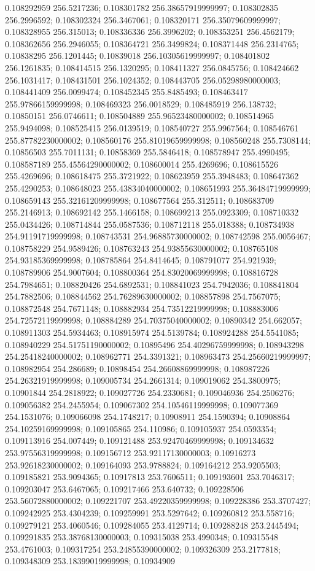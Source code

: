 0.108292959 256.5217236; 0.108301782 256.38657919999997; 0.108302835 256.2996592; 0.108302324 256.3467061; 0.108320171 256.35079609999997; 0.108328955 256.315013; 0.108336336 256.3996202; 0.108353251 256.4562179; 0.108362656 256.2946055; 0.108364721 256.3499824; 0.108371448 256.2314765; 0.10838295 256.1201445; 0.10839018 256.10305619999997; 0.108401802 256.1261835; 0.108414515 256.1320295; 0.108411327 256.0845756; 0.108424662 256.1031417; 0.108431501 256.1024352; 0.108443705 256.05298980000003; 0.108441409 256.0099474; 0.108452345 255.8485493; 0.108463417 255.97866159999998; 0.108469323 256.0018529; 0.108485919 256.138732; 0.10850151 256.0746611; 0.108504889 255.96523480000002; 0.108514965 255.9494098; 0.108525415 256.0139519; 0.108540727 255.9967564; 0.108546761 255.87782230000002; 0.108560176 255.81019659999998; 0.108560248 255.7308144; 0.10856503 255.7011131; 0.10858369 255.5846418; 0.108578947 255.4990495; 0.108587189 255.45564290000002; 0.108600014 255.4269696; 0.108615526 255.4269696; 0.108618475 255.3721922; 0.108623959 255.3948483; 0.108647362 255.4290253; 0.108648023 255.43834040000002; 0.108651993 255.36484719999999; 0.108659143 255.32161209999998; 0.108677564 255.312511; 0.108683709 255.2146913; 0.108692142 255.1466158; 0.108699213 255.0923309; 0.108710332 255.0434426; 0.108714844 255.0587536; 0.108712118 255.018388; 0.108734938 254.91191719999998; 0.108743531 254.96885730000002; 0.108742598 255.0056467; 0.108758229 254.9589426; 0.108763243 254.93855630000002; 0.108765108 254.93185369999998; 0.108785864 254.8414645; 0.108791077 254.921939; 0.108789906 254.9007604; 0.108800364 254.83020069999998; 0.108816728 254.7984651; 0.108820426 254.6892531; 0.108841023 254.7942036; 0.108841804 254.7882506; 0.108844562 254.76289630000002; 0.108857898 254.7567075; 0.108872548 254.7671148; 0.108882934 254.73512219999998; 0.108883006 254.72572119999998; 0.108884289 254.70375040000002; 0.10890342 254.662057; 0.108911303 254.5934463; 0.108915974 254.5139784; 0.108924288 254.5541085; 0.108940229 254.51751190000002; 0.10895496 254.40296759999998; 0.108943298 254.25418240000002; 0.108962771 254.3391321; 0.108963473 254.25660219999997; 0.108982954 254.286689; 0.10898454 254.26608869999998; 0.108987226 254.26321919999998; 0.109005734 254.2661314; 0.109019062 254.3800975; 0.10901844 254.2818922; 0.109027726 254.2330681; 0.109046936 254.2506276; 0.109056382 254.2455954; 0.109067302 254.10546119999998; 0.109077369 254.1531076; 0.109066098 254.1748217; 0.10908911 254.1590394; 0.10908864 254.10259169999998; 0.109105865 254.110986; 0.109105937 254.0593354; 0.109113916 254.007449; 0.109121488 253.92470469999998; 0.109134632 253.97556319999998; 0.109156712 253.92117130000003; 0.10916273 253.92618230000002; 0.109164093 253.9788824; 0.109164212 253.9205503; 0.109185821 253.9094365; 0.10917813 253.7606511; 0.109193601 253.7046317; 0.109203047 253.6467065; 0.109217466 253.640732; 0.109228506 253.56072880000002; 0.109221707 253.49220359999998; 0.109228386 253.3707427; 0.109242925 253.4304239; 0.109259991 253.5297642; 0.109260812 253.558716; 0.109279121 253.4060546; 0.109284055 253.4129714; 0.109288248 253.2445494; 0.109291835 253.38768130000003; 0.109315038 253.4990348; 0.109315548 253.4761003; 0.109317254 253.24855390000002; 0.109326309 253.2177818; 0.109348309 253.18399019999998; 0.10934909 